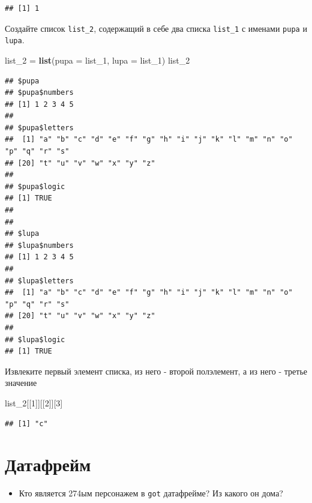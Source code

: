 \documentclass[]{book}
\newenvironment{Shaded}{\begin{snugshade}}{\end{snugshade}}
\newcommand{\KeywordTok}[1]{\textcolor[rgb]{0.13,0.29,0.53}{\textbf{#1}}}
\newcommand{\DataTypeTok}[1]{\textcolor[rgb]{0.13,0.29,0.53}{#1}}
\newcommand{\DecValTok}[1]{\textcolor[rgb]{0.00,0.00,0.81}{#1}}
\newcommand{\StringTok}[1]{\textcolor[rgb]{0.31,0.60,0.02}{#1}}
\newcommand{\NormalTok}[1]{#1}
\providecommand{\tightlist}{%
  \setlength{\itemsep}{0pt}\setlength{\parskip}{0pt}}
\begin{document}
\begin{verbatim}
## [1] 1
\end{verbatim}

Создайте список \texttt{list\_2}, содержащий в себе два списка
\texttt{list\_1} с именами \texttt{pupa} и \texttt{lupa}.

\begin{Shaded}
\begin{Highlighting}[]
\NormalTok{list_}\DecValTok{2}\NormalTok{ =}\StringTok{ }\KeywordTok{list}\NormalTok{(}\DataTypeTok{pupa =}\NormalTok{ list_}\DecValTok{1}\NormalTok{, }\DataTypeTok{lupa =}\NormalTok{ list_}\DecValTok{1}\NormalTok{)}
\NormalTok{list_}\DecValTok{2}
\end{Highlighting}
\end{Shaded}

\begin{verbatim}
## $pupa
## $pupa$numbers
## [1] 1 2 3 4 5
## 
## $pupa$letters
##  [1] "a" "b" "c" "d" "e" "f" "g" "h" "i" "j" "k" "l" "m" "n" "o" "p" "q" "r" "s"
## [20] "t" "u" "v" "w" "x" "y" "z"
## 
## $pupa$logic
## [1] TRUE
## 
## 
## $lupa
## $lupa$numbers
## [1] 1 2 3 4 5
## 
## $lupa$letters
##  [1] "a" "b" "c" "d" "e" "f" "g" "h" "i" "j" "k" "l" "m" "n" "o" "p" "q" "r" "s"
## [20] "t" "u" "v" "w" "x" "y" "z"
## 
## $lupa$logic
## [1] TRUE
\end{verbatim}

Извлеките первый элемент списка, из него - второй полэлемент, а из него
- третье значение

\begin{Shaded}
\begin{Highlighting}[]
\NormalTok{list_}\DecValTok{2}\NormalTok{[[}\DecValTok{1}\NormalTok{]][[}\DecValTok{2}\NormalTok{]][}\DecValTok{3}\NormalTok{]}
\end{Highlighting}
\end{Shaded}

\begin{verbatim}
## [1] "c"
\end{verbatim}

\section{Датафрейм}\label{solvdf_task}

\begin{itemize}
\tightlist
\item
  Кто является 274ым персонажем в \texttt{got} датафрейме? Из какого он
  дома?
\end{itemize}
\end{document}

